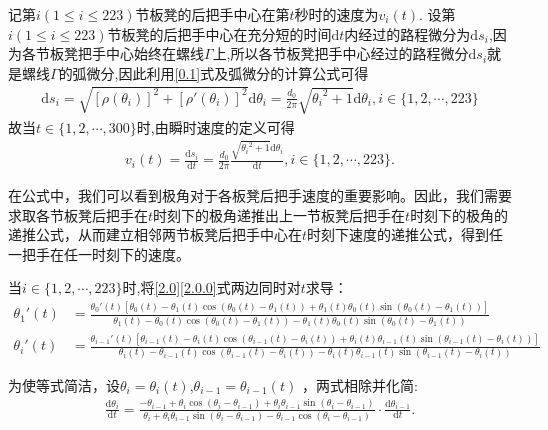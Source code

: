 \documentclass{cumcmthesis}
\begin{document}
\par 记第\(i(1\leqslant i\leqslant 223)\)节板凳的后把手中心在第\(t\)秒时的速度为\(v_i(t)\).
设第\(i(1\leqslant i\leqslant 223)\)节板凳的后把手中心在充分短的时间\(\mathrm{d}t\)内经过的路程微分为\(\mathrm{d}s_i\),因为各节板凳把手中心始终在螺线\(\varGamma\)上,所以各节板凳把手中心经过的路程微分\(\mathrm{d}s_i\)就是螺线\(\varGamma\)的弧微分,因此利用\eqref{0.1}式及弧微分的计算公式可得
\begin{align}\label{1.........12}
\mathrm{d}s_i=\sqrt{[\rho (\theta _i)]^2+[\rho \prime (\theta _i)]^2}\mathrm{d}\theta  _i=\frac{d_0}{2\pi}\sqrt{{\theta _i}^2+1}\mathrm{d}\theta _i,i\in \{ 1,2,\cdots ,223 \}  
\end{align}
故当\(t\in \{ 1,2,\cdots ,300 \}\)时,由瞬时速度的定义可得
\begin{align}
v_i(t) =\frac{\mathrm{d}s_i}{\mathrm{d}t}=\frac{d_0}{2\pi}\frac{\sqrt{{\theta _i}^2 + 1}\mathrm{d}\theta _i}{\mathrm{d}t}, i\in \{1, 2, \cdots, 223\}. \label{3.1}
\end{align}
\par 在公式中，我们可以看到极角对于各板凳后把手速度的重要影响。因此，我们需要求取各节板凳后把手在$t$时刻下的极角递推出上一节板凳后把手在$t$时刻下的极角的递推公式，从而建立相邻两节板凳后把手中心在$t$时刻下速度的递推公式，得到任一把手在任一时刻下的速度。
\par 当\(i\in \{ 1,2,\cdots ,223 \}\)时,将\eqref{2.0}\eqref{2.0.0}式两边同时对\(t\)求导：
\begin{align}
    \theta_{1}'(t)&=\frac{\theta_{0}'(t)[\theta_{0}(t)-\theta_{1}(t)\cos(\theta_{0}(t)-\theta_{1}(t))+\theta_{1}(t)\theta_{0}(t)\sin(\theta_{0}(t)-\theta_{1}(t))]}{\theta_{1}(t)-\theta_{0}(t)\cos(\theta_{0}(t)-\theta_{1}(t))-\theta_{1}(t)\theta_{0}(t)\sin(\theta_{0}(t)-\theta_{1}(t))} \label{3.1.2.3}
\\
\theta_{i}'(t)&=\frac{\theta_{i - 1}'(t)[\theta_{i - 1}(t)-\theta_{i}(t)\cos(\theta_{i - 1}(t)-\theta_{i}(t))+\theta_{i}(t)\theta_{i - 1}(t)\sin(\theta_{i - 1}(t)-\theta_{i}(t))]}{\theta_{i}(t)-\theta_{i - 1}(t)\cos(\theta_{i - 1}(t)-\theta_{i}(t))-\theta_{i}(t)\theta_{i - 1}(t)\sin(\theta_{i - 1}(t)-\theta_{i}(t))}\label{3.1.1.3}
\end{align}
\par 为使等式简洁，设\(\theta _i = \theta _i(t)\),\(\theta _{i - 1} = \theta _{i - 1}(t)\) ，两式相除并化简:
    \begin{align}
\frac{\mathrm{d}\theta _i}{\mathrm{d}t}=\frac{-\theta _{i - 1}+\theta _i\cos(\theta _{i }-\theta _{i-1})+\theta _i\theta _{i - 1}\sin(\theta _{i }-\theta _{i-1})}{\theta _i+\theta _i\theta _{i - 1}\sin(\theta _i -\theta _{i-1})-\theta _{i - 1}\cos(\theta _i -\theta _{i-1})}\cdot \frac{\mathrm{d}\theta _{i - 1}}{\mathrm{d}t}.\label{3.0}
\end{align}
\end{document}

